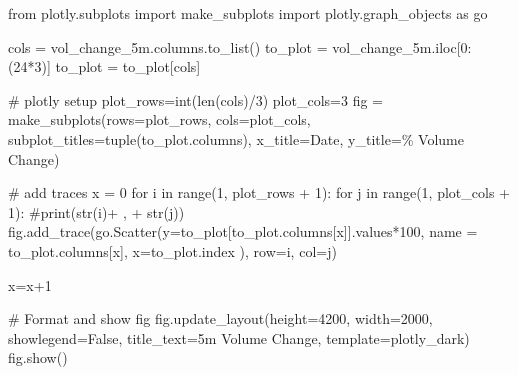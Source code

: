 \documentclass[
  letterpaper,
  DIV=11,
  numbers=noendperiod]{scrartcl}
\newenvironment{Shaded}{\begin{snugshade}}{\end{snugshade}}
\newcommand{\BuiltInTok}[1]{\textcolor[rgb]{0.00,0.23,0.31}{#1}}
\newcommand{\CommentTok}[1]{\textcolor[rgb]{0.37,0.37,0.37}{#1}}
\newcommand{\ControlFlowTok}[1]{\textcolor[rgb]{0.00,0.23,0.31}{#1}}
\newcommand{\DecValTok}[1]{\textcolor[rgb]{0.68,0.00,0.00}{#1}}
\newcommand{\ImportTok}[1]{\textcolor[rgb]{0.00,0.46,0.62}{#1}}
\newcommand{\KeywordTok}[1]{\textcolor[rgb]{0.00,0.23,0.31}{#1}}
\newcommand{\NormalTok}[1]{\textcolor[rgb]{0.00,0.23,0.31}{#1}}
\newcommand{\OperatorTok}[1]{\textcolor[rgb]{0.37,0.37,0.37}{#1}}
\newcommand{\StringTok}[1]{\textcolor[rgb]{0.13,0.47,0.30}{#1}}
\newcommand{\VariableTok}[1]{\textcolor[rgb]{0.07,0.07,0.07}{#1}}
\begin{document}
\begin{Shaded}
\begin{Highlighting}[]
\ImportTok{from}\NormalTok{ plotly.subplots }\ImportTok{import}\NormalTok{ make\_subplots}
\ImportTok{import}\NormalTok{ plotly.graph\_objects }\ImportTok{as}\NormalTok{ go}

\NormalTok{cols }\OperatorTok{=}\NormalTok{ vol\_change\_5m.columns.to\_list()}
\NormalTok{to\_plot }\OperatorTok{=}\NormalTok{ vol\_change\_5m.iloc[}\DecValTok{0}\NormalTok{:(}\DecValTok{24}\OperatorTok{*}\DecValTok{3}\NormalTok{)]}
\NormalTok{to\_plot }\OperatorTok{=}\NormalTok{ to\_plot[cols]}

\CommentTok{\# plotly setup}
\NormalTok{plot\_rows}\OperatorTok{=}\BuiltInTok{int}\NormalTok{(}\BuiltInTok{len}\NormalTok{(cols)}\OperatorTok{/}\DecValTok{3}\NormalTok{)}
\NormalTok{plot\_cols}\OperatorTok{=}\DecValTok{3}
\NormalTok{fig }\OperatorTok{=}\NormalTok{ make\_subplots(rows}\OperatorTok{=}\NormalTok{plot\_rows, cols}\OperatorTok{=}\NormalTok{plot\_cols, subplot\_titles}\OperatorTok{=}\BuiltInTok{tuple}\NormalTok{(to\_plot.columns),}
\NormalTok{                    x\_title}\OperatorTok{=}\StringTok{\textquotesingle{}Date\textquotesingle{}}\NormalTok{,}
\NormalTok{                    y\_title}\OperatorTok{=}\StringTok{\textquotesingle{}\% Volume Change\textquotesingle{}}\NormalTok{)}

\CommentTok{\# add traces}
\NormalTok{x }\OperatorTok{=} \DecValTok{0}
\ControlFlowTok{for}\NormalTok{ i }\KeywordTok{in} \BuiltInTok{range}\NormalTok{(}\DecValTok{1}\NormalTok{, plot\_rows }\OperatorTok{+} \DecValTok{1}\NormalTok{):}
    \ControlFlowTok{for}\NormalTok{ j }\KeywordTok{in} \BuiltInTok{range}\NormalTok{(}\DecValTok{1}\NormalTok{, plot\_cols }\OperatorTok{+} \DecValTok{1}\NormalTok{):}
        \CommentTok{\#print(str(i)+ \textquotesingle{}, \textquotesingle{} + str(j))}
\NormalTok{        fig.add\_trace(go.Scatter(y}\OperatorTok{=}\NormalTok{to\_plot[to\_plot.columns[x]].values}\OperatorTok{*}\DecValTok{100}\NormalTok{,}
\NormalTok{                                 name }\OperatorTok{=}\NormalTok{ to\_plot.columns[x],}
\NormalTok{                                 x}\OperatorTok{=}\NormalTok{to\_plot.index}
\NormalTok{                            ),}
\NormalTok{                     row}\OperatorTok{=}\NormalTok{i,}
\NormalTok{                     col}\OperatorTok{=}\NormalTok{j)}

\NormalTok{        x}\OperatorTok{=}\NormalTok{x}\OperatorTok{+}\DecValTok{1}

\CommentTok{\# Format and show fig}
\NormalTok{fig.update\_layout(height}\OperatorTok{=}\DecValTok{4200}\NormalTok{, width}\OperatorTok{=}\DecValTok{2000}\NormalTok{, showlegend}\OperatorTok{=}\VariableTok{False}\NormalTok{,}
\NormalTok{                  title\_text}\OperatorTok{=}\StringTok{\textquotesingle{}5m Volume Change\textquotesingle{}}\NormalTok{, template}\OperatorTok{=}\StringTok{\textquotesingle{}plotly\_dark\textquotesingle{}}\NormalTok{)}
\NormalTok{fig.show()}
\end{Highlighting}
\end{Shaded}
\end{document}
